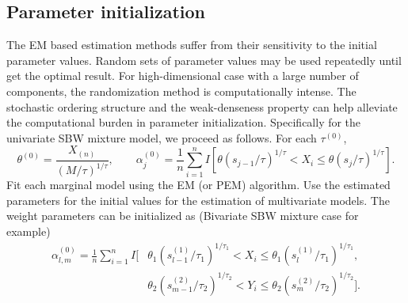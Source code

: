 \documentclass[eng]{csam}
\def\a{\alpha}
\begin{document}
\subsection{Parameter initialization}\label{initial}
The EM based estimation methods suffer from their sensitivity to the initial parameter values. Random sets of parameter values may be used repeatedly until get the optimal result. For high-dimensional case with a large number of components, the randomization method is computationally intense. The stochastic ordering structure and the weak-denseness property can help alleviate the computational burden in parameter initialization.
Specifically for the univariate SBW mixture model, we proceed as follows. For each $\tau^{(0)}$,
\begin{equation*}
\theta^{(0)} = \frac{X_{(n)}}{(M/\tau)^{1/\tau}}, \qquad \a_j^{(0)} = \frac{1}{n}\sum_{i=1}^n I\left[\theta(s_{j-1}/\tau)^{1/\tau} < X_i \le \theta(s_j/\tau)^{1/\tau}\right].
\end{equation*}
Fit each marginal model using the EM (or PEM) algorithm. Use the estimated parameters for the initial values for the estimation of multivariate models. The weight parameters can be initialized as (Bivariate SBW mixture case for example)
\begin{align*}
\a_{l,m}^{(0)} = \frac{1}{n}\sum_{i=1}^n I\Big[ & \theta_1(s^{(1)}_{l-1}/\tau_1)^{1/\tau_1} < X_i \le \theta_1(s^{(1)}_l/\tau_1)^{1/\tau_1},\\
& \theta_2(s^{(2)}_{m-1}/\tau_2)^{1/\tau_2} < Y_{i} \le \theta_2(s^{(2)}_m/\tau_2)^{1/\tau_2}\Big].
\end{align*}
\end{document}
